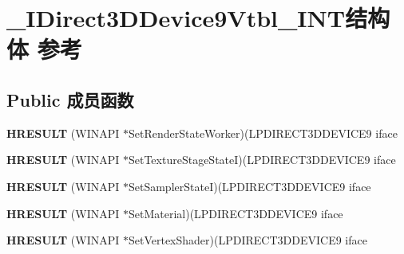 \hypertarget{struct___i_direct3_d_device9_vtbl___i_n_t}{}\section{\+\_\+\+I\+Direct3\+D\+Device9\+Vtbl\+\_\+\+I\+N\+T结构体 参考}
\label{struct___i_direct3_d_device9_vtbl___i_n_t}
\subsection*{Public 成员函数}
\begin{DoxyCompactItemize}
\item 
\mbox{\label{struct___i_direct3_d_device9_vtbl___i_n_t_a6583d73fb7837dd12890b561afe5bc72}} 
{\bfseries H\+R\+E\+S\+U\+LT} (W\+I\+N\+A\+PI $\ast$Set\+Render\+State\+Worker)(L\+P\+D\+I\+R\+E\+C\+T3\+D\+D\+E\+V\+I\+C\+E9 iface
\item 
\mbox{\label{struct___i_direct3_d_device9_vtbl___i_n_t_a6de0e25d84b682f952db509a158e7f77}} 
{\bfseries H\+R\+E\+S\+U\+LT} (W\+I\+N\+A\+PI $\ast$Set\+Texture\+Stage\+StateI)(L\+P\+D\+I\+R\+E\+C\+T3\+D\+D\+E\+V\+I\+C\+E9 iface
\item 
\mbox{\label{struct___i_direct3_d_device9_vtbl___i_n_t_ae5f2792eae297e3f295d7fc77080bab2}} 
{\bfseries H\+R\+E\+S\+U\+LT} (W\+I\+N\+A\+PI $\ast$Set\+Sampler\+StateI)(L\+P\+D\+I\+R\+E\+C\+T3\+D\+D\+E\+V\+I\+C\+E9 iface
\item 
\mbox{\label{struct___i_direct3_d_device9_vtbl___i_n_t_a462ecf137efc883e15635534ec0ca477}} 
{\bfseries H\+R\+E\+S\+U\+LT} (W\+I\+N\+A\+PI $\ast$Set\+Material)(L\+P\+D\+I\+R\+E\+C\+T3\+D\+D\+E\+V\+I\+C\+E9 iface
\item 
\mbox{\label{struct___i_direct3_d_device9_vtbl___i_n_t_a0dc305385d82edd05cdf446c0f7633d4}} 
{\bfseries H\+R\+E\+S\+U\+LT} (W\+I\+N\+A\+PI $\ast$Set\+Vertex\+Shader)(L\+P\+D\+I\+R\+E\+C\+T3\+D\+D\+E\+V\+I\+C\+E9 iface
\item 
\mbox{\label{struct___i_direct3_d_device9_vtbl___i_n_t_acf0cae339e3505a636d5371e44372ea2}} 

\end{DoxyCompactItemize}
